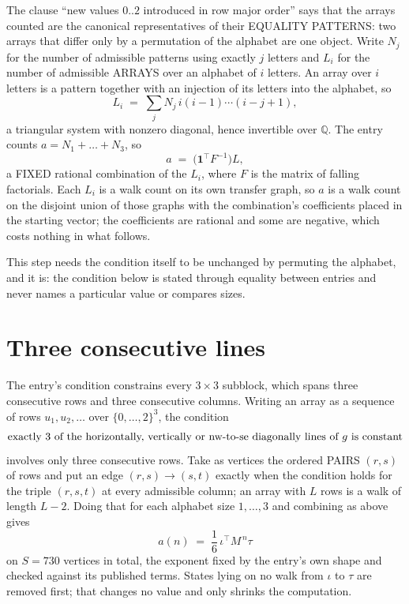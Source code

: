 \documentclass[11pt,a4paper]{article}
\theoremstyle{plain}
\theoremstyle{definition}
\begin{document}
The clause ``new values $0..2$ introduced in row major order'' says that the arrays
counted are the canonical representatives of their EQUALITY PATTERNS: two arrays that differ
only by a permutation of the alphabet are one object. Write $N_j$ for the number of admissible
patterns using exactly $j$ letters and $L_i$ for the number of admissible ARRAYS over an
alphabet of $i$ letters. An array over $i$ letters is a pattern together with an injection of
its letters into the alphabet, so
\[
L_i\;=\;\sum_{j}N_j\,i(i-1)\cdots(i-j+1),
\]
a triangular system with nonzero diagonal, hence invertible over $\mathbb{Q}$. The entry
counts $a=N_1+\dots+N_{3}$, so
\[
a\;=\;\bigl(\mathbf{1}^{\!\top}F^{-1}\bigr)L ,
\]
a FIXED rational combination of the $L_i$, where $F$ is the matrix of falling factorials.
Each $L_i$ is a walk count on its own transfer graph, so $a$ is a walk count on the disjoint
union of those graphs with the combination's coefficients placed in the starting vector; the
coefficients are rational and some are negative, which costs nothing in what follows.

This step needs the condition itself to be unchanged by permuting the alphabet, and it is:
the condition below is stated through equality between entries and never names a particular
value or compares sizes.

\section{Three consecutive lines}

The entry's condition constrains every $3\times3$ subblock, which spans three consecutive
rows and three consecutive columns. Writing an array as a sequence of rows
$u_1,u_2,\dots$ over $\{0,\dots,2\}^{3}$, the condition
\[
\text{exactly }3\text{ of the horizontally, vertically or nw-to-se diagonally lines of }g\text{ \text{is constant}}
\]
involves only three consecutive rows. Take as vertices the ordered PAIRS $(r,s)$ of
rows and put an edge $(r,s)\to(s,t)$ exactly when the condition holds for the triple
$(r,s,t)$ at every admissible column; an array with $L$ rows is a walk of length $L-2$.
Doing that for each alphabet size $1,\dots,3$ and combining as above gives
\[
a(n)\;=\;\frac{1}{6}\,\iota^{\!\top}M^{\,n}\tau
\]
on $S=730$ vertices in total, the exponent fixed by the entry's own shape and checked against
its published terms. States lying on no walk from $\iota$ to $\tau$ are removed first; that
changes no value and only shrinks the computation.
\end{document}
